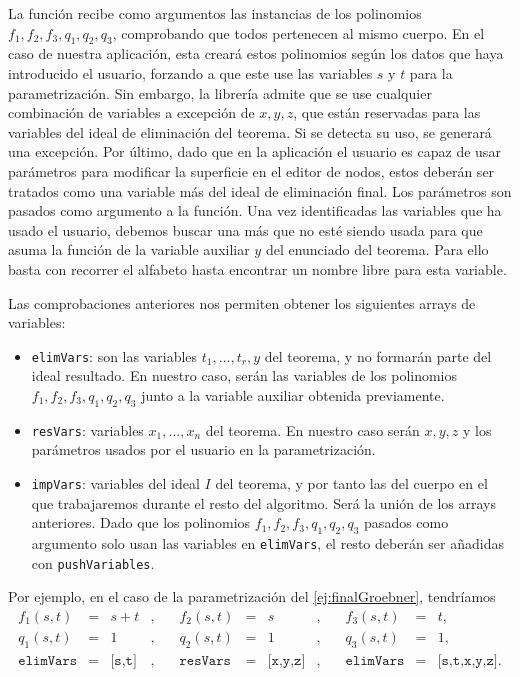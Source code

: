 La función recibe como argumentos las instancias de los polinomios $f_1,f_2,f_3,q_1,q_2,q_3$, comprobando que todos pertenecen al mismo cuerpo. En el caso de nuestra aplicación, esta creará estos polinomios según los datos que haya introducido el usuario, forzando a que este use las variables $s$ y $t$ para la parametrización. Sin embargo, la librería admite que se use cualquier combinación de variables a excepción de $x,y,z$, que están reservadas para las variables del ideal de eliminación del teorema. Si se detecta su uso, se generará una excepción. Por último, dado que en la aplicación el usuario es capaz de usar parámetros para modificar la superficie en el editor de nodos, estos deberán ser tratados como una variable más del ideal de eliminación final. Los parámetros son pasados como argumento a la función. Una vez identificadas las variables que ha usado el usuario, debemos buscar una más que no esté siendo usada para que asuma la función de la variable auxiliar $y$ del enunciado del teorema. Para ello basta con recorrer el alfabeto hasta encontrar un nombre libre para esta variable.\newline

Las comprobaciones anteriores nos permiten obtener los siguientes arrays de variables:
\begin{itemize}
    \item \texttt{elimVars}: son las variables $t_1,\dots, t_r,y$ del teorema, y no formarán parte del ideal resultado. En nuestro caso, serán las variables de los polinomios $f_1,f_2,f_3,q_1,q_2,q_3$ junto a la variable auxiliar obtenida previamente.
    \item \texttt{resVars}: variables $x_1,\dots, x_n$ del teorema. En nuestro caso serán $x,y,z$ y los parámetros usados por el usuario en la parametrización.
    \item \texttt{impVars}: variables del ideal $I$ del teorema, y por tanto las del cuerpo en el que trabajaremos durante el resto del algoritmo. Será la unión de los arrays anteriores. Dado que los polinomios $f_1,f_2,f_3,q_1,q_2,q_3$ pasados como argumento solo usan las variables en \texttt{elimVars}, el resto deberán ser añadidas con \texttt{pushVariables}.
\end{itemize}
Por ejemplo, en el caso de la parametrización del \autoref{ej:finalGroebner}, tendríamos
\begin{align*}
    f_1(s,t)&=&s+t&,\quad &f_2(s,t)&=&s&,\quad &f_3(s,t)&=&t,\\[7pt]
    q_1(s,t)&=&1&,\quad &q_2(s,t)&=&1&,\quad &q_3(s,t)&=&1,\\[7pt]
    \texttt{elimVars}&=&\texttt{[s,t]}&,\quad &\texttt{resVars}&=&\texttt{[x,y,z]}&,\quad &\texttt{elimVars}&=&\texttt{[s,t,x,y,z]}.
\end{align*}

